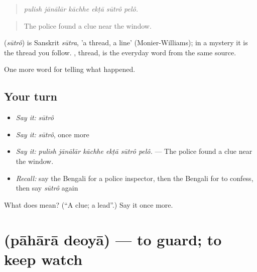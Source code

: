 \begin{quote}
     
\end{quote}

\begin{quote}
\emph{pulish jānālār kāchhe ekṭā sūtrô pelô.}
\end{quote}

\begin{quote}
The police found a clue near the window.
\end{quote}

\begin{cousinweb}
\textbf{} (\emph{sūtrô}) is Sanskrit \emph{sūtra}, 'a thread, a line' (Monier-Williams); in a mystery it is the thread you follow. \textbf{}, thread, is the everyday word from the same source.
\end{cousinweb}

\begin{grammarlens}[title={What you've built}]
One more word for telling what happened.
\end{grammarlens}

\subsection*{Your turn}
\begin{itemize}
\raggedright
  \item \emph{Say it:} \emph{sūtrô}
  \item \emph{Say it:} \emph{sūtrô}, once more
  \item \emph{Say it:} \emph{pulish jānālār kāchhe ekṭā sūtrô pelô.} — The police found a clue near the window.
  \item \emph{Recall:} say the Bengali for a police inspector, then the Bengali for to confess, then say \emph{sūtrô} again
\end{itemize}

\begin{tcolorbox}[breakable,colback=teal!4,colframe=teal!35!black,title={Before you move on}]
What does  mean? (\textquotedblleft{}A clue; a lead\textquotedblright{}.) Say it once more.
\end{tcolorbox}
\section[\texorpdfstring{\bn{পাহারা} \bn{দেওয়া} (pāhārā deoyā)}{পাহারা দেওয়া (pāhārā deoyā)}]{  (pāhārā deoyā) — to guard; to keep watch}

